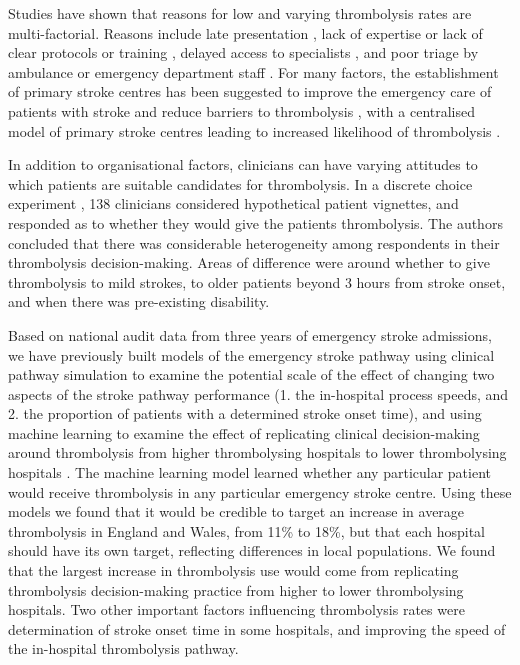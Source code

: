 Studies have shown that reasons for low and varying thrombolysis rates are multi-factorial. Reasons include late presentation \cite{aguiar_de_sousa_access_2019}, lack of expertise \cite{aguiar_de_sousa_access_2019} or lack of clear protocols or training \cite{carter-jones_stroke_2011}, delayed access to specialists \cite{kamal_delays_2017}, and poor triage by ambulance or emergency department staff \cite{carter-jones_stroke_2011}. For many factors, the establishment of primary stroke centres has been suggested to improve the emergency care of patients with stroke and reduce barriers to thrombolysis \cite{carter-jones_stroke_2011}, with a centralised model of primary stroke centres leading to increased likelihood of thrombolysis \cite{lahr_proportion_2012, morris_impact_2014, hunter_impact_2013}. 

In addition to organisational factors, clinicians can have varying attitudes to which patients are suitable candidates for thrombolysis. In a discrete choice experiment \cite{de_brun_factors_2018}, 138 clinicians considered hypothetical patient vignettes, and responded as to whether they would give the patients thrombolysis. The authors concluded that there was considerable heterogeneity among respondents in their thrombolysis decision-making. Areas of difference were around whether to give thrombolysis to mild strokes, to older patients beyond 3 hours from stroke onset, and when there was pre-existing disability.

Based on national audit data from three years of emergency stroke admissions, we have previously built models of the emergency stroke pathway using clinical pathway simulation to examine the potential scale of the effect of changing two aspects of the stroke pathway performance (1. the in-hospital process speeds, and 2. the proportion of patients with a determined stroke onset time), and using machine learning to examine the effect of replicating clinical decision-making around thrombolysis from higher thrombolysing hospitals to lower thrombolysing hospitals \cite{allen_using_2022, allen_use_2022}. The machine learning model learned whether any particular patient would receive thrombolysis in any particular emergency stroke centre. Using these models we found that it would be credible to target an increase in average thrombolysis in England and Wales, from 11\% to 18\%, but that each hospital should have its own target, reflecting differences in local populations. We found that the largest increase in thrombolysis use would come from replicating thrombolysis decision-making practice from higher to lower thrombolysing hospitals. Two other important factors influencing thrombolysis rates were determination of stroke onset time in some hospitals, and improving the speed of the in-hospital thrombolysis pathway.

